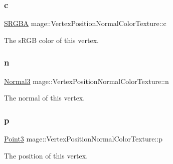 \subsubsection{\texorpdfstring{c}{c}}
{\footnotesize\ttfamily \hyperlink{structmage_1_1_s_r_g_b_a}{S\+R\+G\+BA} mage\+::\+Vertex\+Position\+Normal\+Color\+Texture\+::c}

The s\+R\+GB color of this vertex. \hypertarget{structmage_1_1_vertex_position_normal_color_texture_a7304bf677ad4f16aea974e63f4324eba}{}\label{structmage_1_1_vertex_position_normal_color_texture_a7304bf677ad4f16aea974e63f4324eba} 
\subsubsection{\texorpdfstring{n}{n}}
{\footnotesize\ttfamily \hyperlink{structmage_1_1_normal3}{Normal3} mage\+::\+Vertex\+Position\+Normal\+Color\+Texture\+::n}

The normal of this vertex. \hypertarget{structmage_1_1_vertex_position_normal_color_texture_ac7808865ca6672b7d0f4f8457077bd16}{}\label{structmage_1_1_vertex_position_normal_color_texture_ac7808865ca6672b7d0f4f8457077bd16} 
\subsubsection{\texorpdfstring{p}{p}}
{\footnotesize\ttfamily \hyperlink{structmage_1_1_point3}{Point3} mage\+::\+Vertex\+Position\+Normal\+Color\+Texture\+::p}

The position of this vertex. \hypertarget{structmage_1_1_vertex_position_normal_color_texture_a95286a5de390f414f036371f4ad08de1}{}\label{structmage_1_1_vertex_position_normal_color_texture_a95286a5de390f414f036371f4ad08de1} 
